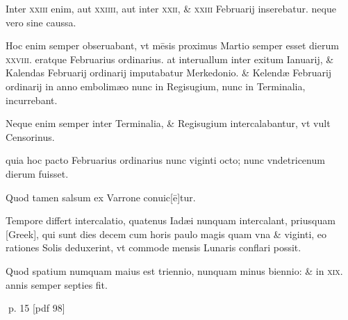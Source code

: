 \begin{parnumbers}
Inter \textsc{xxiii} enim, aut \textsc{xxiiii}, aut inter \textsc{xxii}, \& \textsc{xxiii} Februarij inserebatur. neque vero sine caussa.

Hoc enim semper obseruabant, vt mēsis proximus Martio semper esset dierum \textsc{xxviii}. eratque Februarius ordinarius. at interuallum inter exitum Ianuarij, \& Kalendas Februarij ordinarij imputabatur Merkedonio. \& Kelendæ Februarij ordinarij in anno embolimæo nunc in Regisugium, nunc in Terminalia, incurrebant.

Neque enim semper inter Terminalia, \& Regisugium intercalabantur, vt vult Censorinus.

quia hoc pacto Februarius ordinarius nunc viginti octo; nunc vndetricenum dierum fuisset.

Quod tamen salsum ex Varrone conuic[ē]tur.

Tempore differt intercalatio, quatenus Iadæi nunquam intercalant, priusquam \textgreek{[Greek]}, qui sunt dies decem cum horis paulo magis quam vna \& viginti, eo rationes Solis deduxerint, vt commode mensis Lunaris conflari possit.

Quod spatium numquam maius est triennio, nunquam minus biennio: \& in \textsc{xix}. annis semper septies fit.

\end{parnumbers}
\clearpage
p. 15 [pdf 98]

